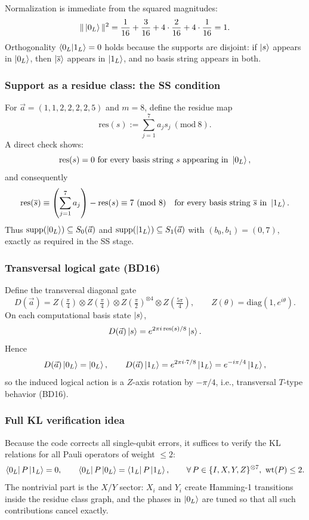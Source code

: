 \documentclass[11pt]{article}
\begin{document}
Normalization is immediate from the squared magnitudes:
\[
\|\ket{0_L}\|^2
=
\frac{1}{16}
+\frac{3}{16}
+4\cdot \frac{2}{16}
+4\cdot \frac{1}{16}
=1.
\]
Orthogonality \(\braket{0_L|1_L}=0\) holds because the supports are disjoint: if \(\ket{s}\) appears in \(\ket{0_L}\), then \(\ket{\overline{s}}\) appears in \(\ket{1_L}\), and no basis string appears in both.

\subsubsection{Support as a residue class: the SS condition}

For \(\vec a=(1,1,2,2,2,2,5)\) and \(m=8\), define the residue map
\[
\mathrm{res}(s):=\sum_{j=1}^7 a_js_j \ (\mathrm{mod}\ 8).
\]
A direct check shows:
\[
\mathrm{res}(s)=0\ \text{for every basis string } s \text{ appearing in } \ket{0_L},
\]
and consequently
\[
\mathrm{res}(\overline{s})\equiv \left(\sum_{j=1}^7 a_j\right)-\mathrm{res}(s)\equiv 7\ (\mathrm{mod}\ 8)
\quad\text{for every basis string } \overline{s}\text{ in }\ket{1_L}.
\]
Thus \(\mathrm{supp}(\ket{0_L})\subseteq S_0(\vec a)\) and \(\mathrm{supp}(\ket{1_L})\subseteq S_1(\vec a)\) with \((b_0,b_1)=(0,7)\), exactly as required in the SS stage.

\subsubsection{Transversal logical gate (BD16)}

Define the transversal diagonal gate
\[
D(\vec a)=Z(\tfrac{\pi}{4})\otimes Z(\tfrac{\pi}{4})\otimes Z(\tfrac{\pi}{2})^{\otimes 4}\otimes Z(\tfrac{5\pi}{4}),
\qquad Z(\theta)=\mathrm{diag}(1,e^{i\theta}).
\]
On each computational basis state \(\ket{s}\),
\[
D(\vec a)\ket{s}=e^{2\pi i\,\mathrm{res}(s)/8}\ket{s}.
\]
Hence
\[
D(\vec a)\ket{0_L}=\ket{0_L},\qquad
D(\vec a)\ket{1_L}=e^{2\pi i\cdot 7/8}\ket{1_L}=e^{-i\pi/4}\ket{1_L},
\]
so the induced logical action is a \(Z\)-axis rotation by \(-\pi/4\), i.e., transversal \(T\)-type behavior (BD16).

\subsubsection{Full KL verification idea}

Because the code corrects all single-qubit errors, it suffices to verify the KL relations for all Pauli operators of weight \(\le 2\):
\[
\bra{0_L}P\ket{1_L}=0,\qquad
\bra{0_L}P\ket{0_L}=\bra{1_L}P\ket{1_L},
\qquad \forall\, P\in \{I,X,Y,Z\}^{\otimes 7},\ \mathrm{wt}(P)\le 2.
\]
The nontrivial part is the \(X/Y\) sector: \(X_i\) and \(Y_i\) create Hamming-1 transitions inside the residue class graph, and the phases in \(\ket{0_L}\) are tuned so that all such contributions cancel exactly.
\end{document}
